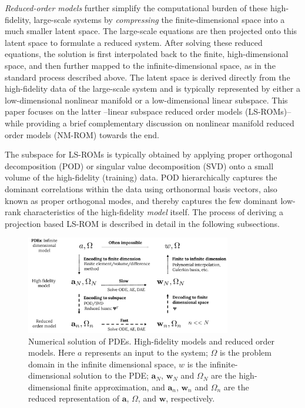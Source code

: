 \documentclass[11pt]{article}
\renewcommand{\vec}[1]{\mathbf{#1}}
\begin{document}
\emph{Reduced-order models} further simplify the computational burden of these high-fidelity, large-scale systems by \emph{compressing} the finite-dimensional space into a much smaller latent space.
The large-scale equations are then projected onto this latent space to formulate a reduced system.
After solving these reduced equations, the solution is first interpolated back to the finite, high-dimensional space, and then further mapped to the infinite-dimensional space, as in the standard process described above.
The latent space is derived directly from the high-fidelity data of the large-scale system and is typically represented  by either a low-dimensional nonlinear manifold or a low-dimensional linear subspace.
This paper focuses on the latter --linear subspace reduced order models (LS-ROMs)-- while providing a brief complementary discussion on nonlinear manifold reduced order models (NM-ROM) towards the end.


The subspace for LS-ROMs is typically obtained by applying proper orthogonal decomposition (POD) or singular value decomposition (SVD) onto a small volume of the high-fidelity (training) data.
POD hierarchically captures the dominant correlations within the data using orthonormal basis vectors, also known as proper orthogonal modes, and thereby captures the few dominant low-rank characteristics of the high-fidelity \textit{model} itself.
The process of deriving a projection based LS-ROM is described in detail in the following subsections.

\begin{figure}[t]
\centering
\includegraphics[width=0.8\textwidth]{schematic.pdf}
\caption{Numerical solution of PDEs. High-fidelity models and reduced order models. Here $a$ represents an input to the system; $\Omega$ is the problem domain in the infinite dimensional space, $w$ is the infinite-dimensional solution to the PDE; $\vec{a}_N$, $\vec{w}_N$ and $\Omega_N$ are the high-dimensional finite approximation, and $\vec{a}_n$, $\vec{w}_n$ and $\Omega_n$ are the reduced representation of  $\vec{a}$, $\Omega$, and $\vec{w}$, respectively.}
\label{fig:ROM_FOM_schematic}
\end{figure}
\end{document}
